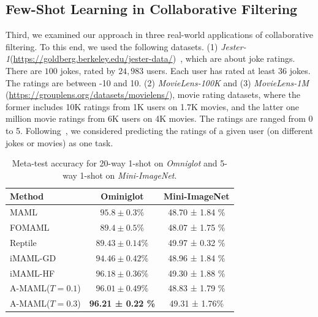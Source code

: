 \subsection{Few-Shot Learning in Collaborative Filtering}
\vspace{-0.1in}
Third, we examined our approach in three real-world applications of collaborative filtering. To this end, we used the following datasets. (1) \textit{Jester-1}({\url{https://goldberg.berkeley.edu/jester-data/}})~\citep{goldberg2001eigentaste}, which are about joke ratings. There are $100$ jokes, rated by $24,983$ users. Each user has rated at least $36$ jokes. The ratings are between -10 and 10. (2) \textit{MovieLens-100K}  and (3) \textit{MovieLens-1M} ({\url{https://grouplens.org/datasets/movielens/}}), movie rating datasets, where the former includes 10K ratings from 1K users on 1.7K movies, and the latter one million movie ratings from 6K users on 4K movies. The ratings are ranged from 0 to 5. 
Following~\citep{denevi2020advantage,denevi2021conditional}, we considered predicting the ratings of a given user (on different jokes or movies) as one task. 
\begin{table}
	\small
	\vspace{-0.05in}
	\begin{center}
		\begin{small}
			\begin{tabular}{lcc}
				\toprule
				Method & {Ominiglot} & {Mini-ImageNet}  \\
				\midrule
				MAML   						   & $ 95.8 \pm 0.3\%$ & 48.70 ± 1.84 \%    \\
				FOMAML 					    & $ 89.4 \pm 0.5\% $  & 48.07 ± 1.75 \%  \\
				Reptile   					     &  $ 89.43 \pm 0.14\% $  & 49.97 ± 0.32 \% \\
				iMAML-GD 			       & $ 94.46 \pm 0.42\%$ & 48.96 ± 1.84 \%          \\
				iMAML-HF    			   &  $96.18 \pm 0.36\%$ & 49.30 ± 1.88 \%  \\
				A-MAML($T=0.1$)     & $96.01 \pm 0.49\%$  & 48.83 ± 1.79 \%   \\
				A-MAML($T=0.3$)    & \textbf{96.21 ± 0.22 \%}   & 49.31 ± 1.76\%  \\
				\bottomrule
			\end{tabular}
			\caption{\small Meta-test accuracy for 20-way 1-shot on \textit{Omniglot} and 5-way 1-shot on \textit{Mini-ImageNet}.} \label{tb:image}
		\end{small}
	\end{center}
\end{table}

